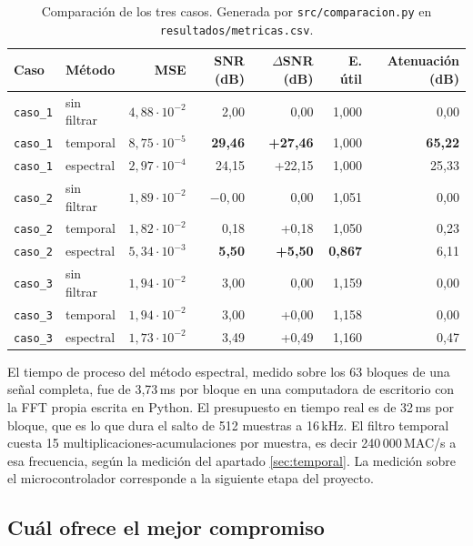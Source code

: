 \begin{table}[H]
\centering\small
\caption{Comparación de los tres casos. Generada por \texttt{src/comparacion.py}
en \texttt{resultados/metricas.csv}.}
\begin{tabular}{llrrrrr}
\toprule
Caso & Método & MSE & SNR (dB) & $\Delta$SNR (dB) & E. útil & Atenuación (dB) \\
\midrule
\texttt{caso\_1} & sin filtrar & $4{,}88\cdot10^{-2}$ & 2,00 & 0,00 & 1,000 & 0,00 \\
\texttt{caso\_1} & temporal    & $8{,}75\cdot10^{-5}$ & \textbf{29,46} & \textbf{+27,46} & 1,000 & \textbf{65,22} \\
\texttt{caso\_1} & espectral   & $2{,}97\cdot10^{-4}$ & 24,15 & +22,15 & 1,000 & 25,33 \\
\midrule
\texttt{caso\_2} & sin filtrar & $1{,}89\cdot10^{-2}$ & $-0{,}00$ & 0,00 & 1,051 & 0,00 \\
\texttt{caso\_2} & temporal    & $1{,}82\cdot10^{-2}$ & 0,18 & +0,18 & 1,050 & 0,23 \\
\texttt{caso\_2} & espectral   & $5{,}34\cdot10^{-3}$ & \textbf{5,50} & \textbf{+5,50} & \textbf{0,867} & 6,11 \\
\midrule
\texttt{caso\_3} & sin filtrar & $1{,}94\cdot10^{-2}$ & 3,00 & 0,00 & 1,159 & 0,00 \\
\texttt{caso\_3} & temporal    & $1{,}94\cdot10^{-2}$ & 3,00 & +0,00 & 1,158 & 0,00 \\
\texttt{caso\_3} & espectral   & $1{,}73\cdot10^{-2}$ & 3,49 & +0,49 & 1,160 & 0,47 \\
\bottomrule
\end{tabular}
\end{table}

El tiempo de proceso del método espectral, medido sobre los 63 bloques de una
señal completa, fue de 3,73\,ms por bloque en una computadora de escritorio con
la FFT propia escrita en Python. El presupuesto en tiempo real es de 32\,ms por
bloque, que es lo que dura el salto de 512 muestras a 16\,kHz. El filtro temporal
cuesta 15 multiplicaciones-acumulaciones por muestra, es decir 240\,000\,MAC/s a
esa frecuencia, según la medición del apartado \ref{sec:temporal}. La medición
sobre el microcontrolador corresponde a la siguiente etapa del proyecto.

\subsection{Cuál ofrece el mejor compromiso}

